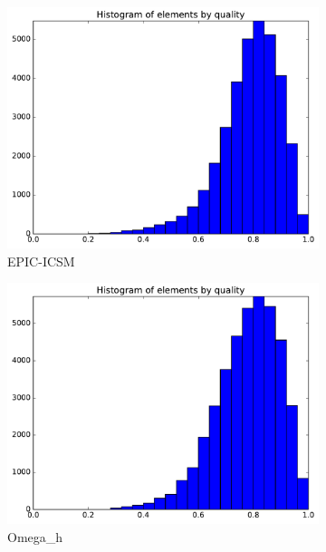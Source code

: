 \documentclass[3p,times,procedia,number]{elsarticle}
\begin{document}
\begin{figure}
\begin{subfigure}{.4\textwidth}
\includegraphics[width=\textwidth]{epic-icsm-cube-cylinder-linear-quality.pdf}
\caption{EPIC-ICSM}
\end{subfigure}
\begin{subfigure}{.4\textwidth}
\centering
\includegraphics[width=\textwidth]{omega_h-cube-cylinder-linear-quality.pdf}
\caption{Omega\_h}
\end{subfigure}
\begin{subfigure}{.4\textwidth}
\centering

\end{subfigure}
\end{figure}
\end{document}
